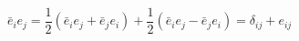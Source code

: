 \begin{equation}
\bar{e}_i e_j =\frac{1}{2} (\bar{e}_i e_j+\bar{e}_j e_i) +\frac{1}{2}(\bar{e}_i e_j - \bar{e}_j e_i)=\delta_{ij}+e_{ij}
\end{equation}

